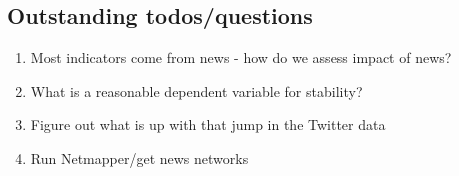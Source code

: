 \subsection{Outstanding todos/questions}

\begin{enumerate}
    \item Most indicators come from news - how do we assess impact of news?
    \item What is a reasonable dependent variable for stability?
    \item Figure out what is up with that jump in the Twitter data
    \item Run Netmapper/get news networks
\end{enumerate}



